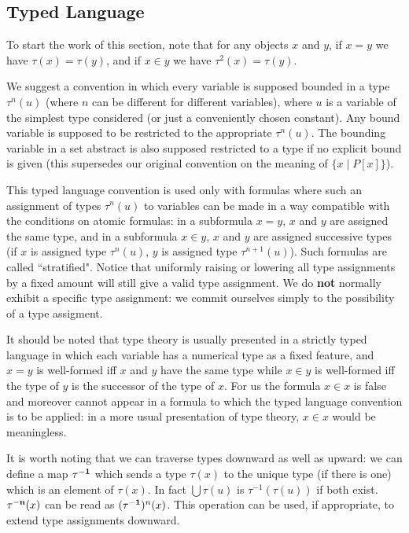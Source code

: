 \documentclass[12pt]{book}
\begin{document}
\newpage

\subsection{Typed Language}

To start the work of this section, note that for any objects $x$ and $y$, if $x=y$ we have $\tau(x)=\tau(y)$, and if $x \in y$ we have $\tau^2(x)=\tau(y)$.

We suggest a convention in which every variable is supposed bounded in a type $\tau^n(u)$ (where $n$ can be different for different variables), where $u$ is a variable of the simplest type considered (or just a conveniently chosen constant).  Any bound variable
is supposed to be restricted to the appropriate $\tau^n(u)$.  The bounding variable in a set abstract is also supposed restricted to a type if no explicit bound is given (this supersedes our original convention on the meaning of $\{x \mid P[x]\}$).

This typed language convention is used only with formulas where such an assignment of types $\tau^n(u)$ to variables  can be made  in a way compatible with the conditions on atomic formulas:  in a subformula $x=y$, $x$ and $y$ are assigned the same type, and in a subformula $x \in y$, $x$ and $y$ are assigned successive types (if $x$ is assigned type $\tau^n(u)$, $y$ is assigned type $\tau^{n+1}(u)$).  Such formulas are called
``stratified".   Notice that uniformly raising or lowering all type assignments by a fixed amount will still give a valid type assignment.  We do {\bf not} normally exhibit a specific type assignment:  we commit ourselves simply to the possibility of a type assigment.

It should be noted that type theory is usually presented in a strictly typed language in which each variable has a numerical type as a fixed feature, and $x=y$ is well-formed
iff $x$ and $y$ have the same type while $x \in y$ is well-formed iff the type of $y$ is the successor of the type of $x$.  For us the formula $x \in x$ is false and moreover cannot appear in a formula to which the typed language convention is to be applied:  in a more usual presentation of type theory, $x \in x$ would be meaningless.

It is worth noting that we can traverse types downward as well as upward:  we can define a map $\tau^{\bf -1}$ which sends a type $\tau(x)$ to the unique type (if there is one)
which is an element of $\tau(x)$.  In fact $\bigcup \tau(u)$ is $\tau^{-1}(\tau(u))$ if both exist.  $\tau^{\bf -n}(x)$ can be read as $(\tau^{\bf -1})^n(x)$.  This operation can be used, if appropriate, to extend type assignments downward.
\end{document}
